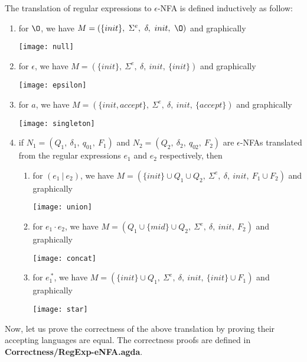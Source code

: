 \begin{defn}
\noindent The translation of regular expressions
to \(\epsilon\)-NFA is defined inductively as follow:
\begin{enumerate}[nolistsep]
  \item for \(\O\), we have \(M = (\{init\},\ \Sigma^e,\ \delta,\
    init,\ \O)\) and graphically \begin{center}\texttt{[image: null]}\end{center}
  \item for \(\epsilon\), we have \(M = (\{init\},\ \Sigma^e,\
    \delta,\ init,\ \{init\})\) and graphically \begin{center}\texttt{[image: epsilon]}\end{center}
  \item for \(a\), we have \(M = (\{init, accept\},\ \Sigma^e,\
    \delta,\ init,\ \{accept\})\) and graphically \begin{center}\texttt{[image: singleton]}\end{center}
  \item if \(N_1 = (Q_1,\ \delta_1,\ q_{01},\ F_1)\) and \(N_2 =
    (Q_2,\ \delta_2,\ q_{02},\ F_2)\) are \(\epsilon\)-NFAs translated from the
    regular expressions \(e_1\) and \(e_2\) respectively, then
    \begin{enumerate}[nolistsep]
      \item for \((e_1\ |\ e_2)\), we have \(M = (\{init\} \cup Q_1
        \cup Q_2,\ \Sigma^e,\ \delta,\ init,\ F_1 \cup F_2)\) and
        graphically \begin{center}\texttt{[image: union]}\end{center}
      \item for \(e_1\cdot e_2\), we have \(M = (Q_1 \cup \{mid\}
        \cup Q_2,\ \Sigma^e,\ \delta,\ init,\ F_2)\) and graphically \begin{center}\texttt{[image: concat]}\end{center}
      \item for \(e_1^{\ *}\), we have \(M = (\{init\} \cup Q_1,\
        \Sigma^e,\ \delta,\ init,\ \{init\} \cup F_1)\) and
        graphically \begin{center}\texttt{[image: star]}\end{center}
     \end{enumerate}
\end{enumerate}
\end{defn}

\par Now, let us prove the correctness of the above translation by
proving their accepting languages are equal. The correctness proofs
are defined in \textbf{Correctness/RegExp-eNFA.agda}. 

